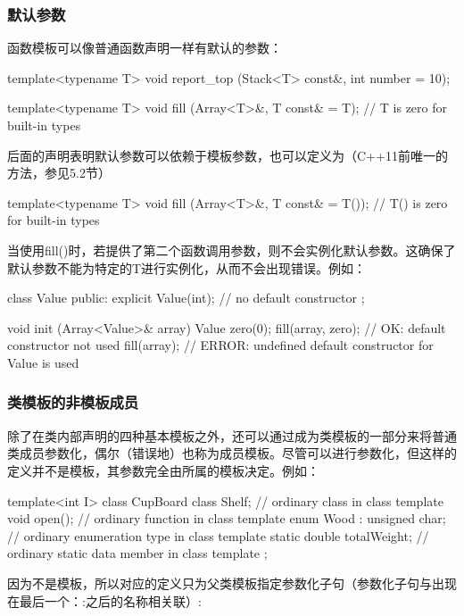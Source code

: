 \subsubsection{默认参数}

函数模板可以像普通函数声明一样有默认的参数：

\begin{cpp}
template<typename T>
void report_top (Stack<T> const&, int number = 10);

template<typename T>
void fill (Array<T>&, T const& = T{}); // T{} is zero for built-in types
\end{cpp}

后面的声明表明默认参数可以依赖于模板参数，也可以定义为（C++11前唯一的方法，参见5.2节）

\begin{cpp}
template<typename T>
void fill (Array<T>&, T const& = T()); // T() is zero for built-in types
\end{cpp}

当使用fill()时，若提供了第二个函数调用参数，则不会实例化默认参数。这确保了默认参数不能为特定的T进行实例化，从而不会出现错误。例如：

\begin{cpp}
class Value {
public:
	explicit Value(int); // no default constructor
};

void init (Array<Value>& array)
{
	Value zero(0);
	fill(array, zero); // OK: default constructor not used
	fill(array); // ERROR: undefined default constructor for Value is used
}
\end{cpp}

\subsubsection{类模板的非模板成员}

除了在类内部声明的四种基本模板之外，还可以通过成为类模板的一部分来将普通类成员参数化，偶尔（错误地）也称为成员模板。尽管可以进行参数化，但这样的定义并不是模板，其参数完全由所属的模板决定。例如：

\begin{cpp}
template<int I>
class CupBoard
{
	class Shelf; // ordinary class in class template
	void open(); // ordinary function in class template
	enum Wood : unsigned char; // ordinary enumeration type in class template
	static double totalWeight; // ordinary static data member in class template
};
\end{cpp}

因为不是模板，所以对应的定义只为父类模板指定参数化子句（参数化子句与出现在最后一个：:之后的名称相关联）:

